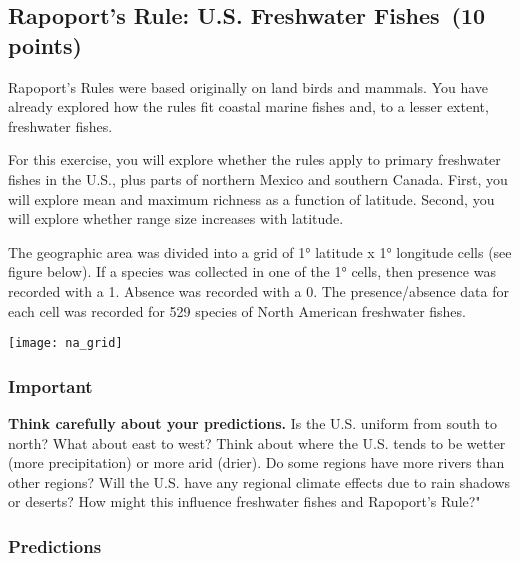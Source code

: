 \documentclass[11pt]{article}
\newcommand{\assignmentTitle}{Rapoport's Rule: U.S. Freshwater Fishes}
\begin{document}
\thispagestyle{firstpage}

\subsection*{\assignmentTitle\ (10 points)}

Rapoport's Rules were based originally on land birds and mammals. You have 
already explored how the rules fit coastal marine fishes and, to a lesser extent,
freshwater fishes. 

For this exercise, you will explore whether the rules apply to 
primary freshwater fishes in the U.S., plus parts of northern Mexico and southern 
Canada. First, you will explore mean and maximum richness as a function of latitude.
Second, you will explore whether range size increases with latitude.

The geographic area was divided into a grid of 1° latitude x 1° longitude cells
(see figure below). If a species was collected in one of the 1° cells, then
presence was recorded with a 1. Absence was recorded with a 0. The 
presence/absence data for each cell was recorded for 529 species of North American
freshwater fishes.

\begin{center}
	\texttt{[image: na\_grid]}
\end{center}

\subsubsection*{Important}

\textbf{Think carefully about your predictions.} Is the U.S. uniform from
south to north? What about east to west? Think about where the U.S. tends
to be wetter (more precipitation) or more arid (drier). Do some regions
have more rivers than other regions? Will the U.S. have any regional climate
effects due to rain shadows or deserts? How might this influence freshwater
fishes and Rapoport's Rule?"

\newpage

\subsubsection*{Predictions}
\end{document}
